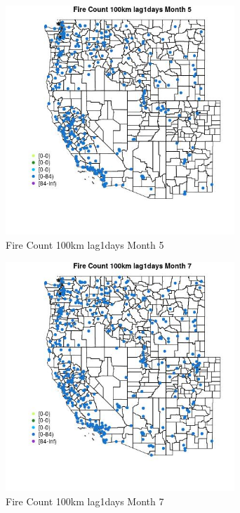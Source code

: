\begin{figure} 
\centering  
\includegraphics[width=0.77\textwidth]{Code_Outputs/Report_ML_input_PM25_Step4_part_e_de_duplicated_aves_compiled_2019-05-18wNAs_MapObsMo5Fire_Count_100km_lag1days.jpg} 
\caption{\label{fig:Report_ML_input_PM25_Step4_part_e_de_duplicated_aves_compiled_2019-05-18wNAsMapObsMo5Fire_Count_100km_lag1days}Fire Count 100km lag1days Month 5} 
\end{figure} 
 

\begin{figure} 
\centering  
\includegraphics[width=0.77\textwidth]{Code_Outputs/Report_ML_input_PM25_Step4_part_e_de_duplicated_aves_compiled_2019-05-18wNAs_MapObsMo7Fire_Count_100km_lag1days.jpg} 
\caption{\label{fig:Report_ML_input_PM25_Step4_part_e_de_duplicated_aves_compiled_2019-05-18wNAsMapObsMo7Fire_Count_100km_lag1days}Fire Count 100km lag1days Month 7} 
\end{figure} 
 

